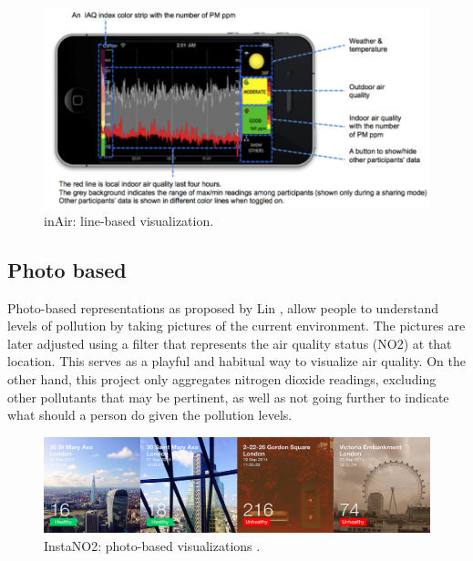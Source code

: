 \begin{figure}[H]
\begin{adjustbox}{width=1\textwidth,center=\textwidth}
  \centering
  \includegraphics[scale=1]{images/InAir.png}
\end{adjustbox}
  \caption[inAir project: line-based visualizations]{inAir: line-based visualization\cite{Kim2013}.}
  \label{fig:line_based_inAir}
\end{figure}


\subsection{Photo based}
Photo-based representations as proposed by Lin \cite{Lin2014}, allow people to understand levels of pollution by taking pictures of the current environment. The pictures are later adjusted using a filter that represents the air quality status (NO2) at that location. This serves as a playful and habitual way to visualize air quality. On the other hand, this project only aggregates nitrogen dioxide readings, excluding other pollutants that may be pertinent, as well as not going further to indicate what should a person do given the pollution levels.

\begin{figure}[H]
\begin{adjustbox}{width=.8\textwidth,center=\textwidth}
  \centering
  \includegraphics[scale=.4]{images/instaNO2.jpg}
\end{adjustbox}
  \caption[InstaNO2 project: photo-based visualizations]{InstaNO2: photo-based visualizations \cite{Lin2014}.}
  \label{fig:photo_based_instaNO2}
\end{figure}

